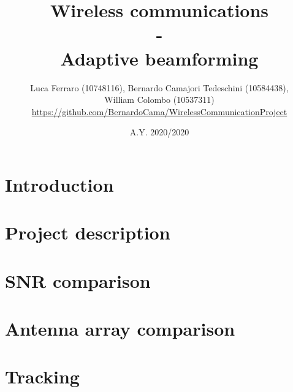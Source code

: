 \documentclass{article} %
\title{\textbf{\huge{Wireless communications \\ 
                             - \\ 
                    Adaptive beamforming}}}
\author{Luca Ferraro (10748116), Bernardo Camajori Tedeschini (10584438), \\
            William Colombo (10537311)\\ 
\textcolor{url_blue}{\url{https://github.com/BernardoCama/WirelessCommunicationProject}}}
\date{A.Y. 2020/2020}
\begin{document}

\begin{titlingpage}
    \maketitle
\end{titlingpage}

\newpage{}

\tableofcontents
\listoffigures
\newpage{}

\clearpage
\section{Introduction}
\label{sec:introduction}


\clearpage
\section{Project description}
\label{sec:project}


\clearpage
\section{SNR comparison}
\label{sec:snr_comparison}


\clearpage
\section{Antenna array comparison}
\label{sec:antenna_array_comparison}


\clearpage
\section{Tracking}
\label{sec:tracking}

\end{document}
